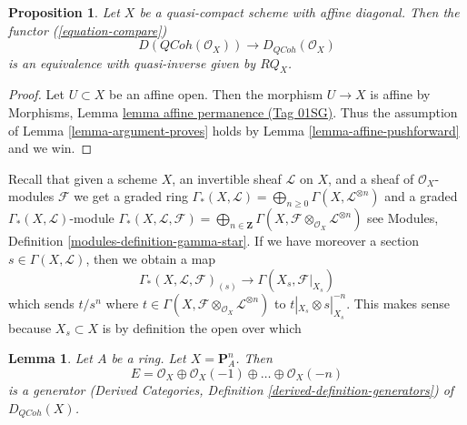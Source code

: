 \documentclass{amsart}
\theoremstyle{plain}
\newtheorem{proposition}[subsection]{Proposition}
\newtheorem{lemma}[subsection]{Lemma}
\theoremstyle{definition}
\theoremstyle{remark}
\numberwithin{equation}{subsection}
\def\QCoh{\mathit{QCoh}}
\begin{document}
\begin{proposition}
\label{proposition-quasi-compact-affine-diagonal}
Let $X$ be a quasi-compact scheme with affine diagonal.
Then the functor (\ref{equation-compare})
$$
D(\QCoh(\mathcal{O}_X))
\longrightarrow
D_\QCoh(\mathcal{O}_X)
$$
is an equivalence with quasi-inverse given by $RQ_X$.
\end{proposition}

\begin{proof}
Let $U \subset X$ be an affine open. Then the morphism
$U \to X$ is affine by
Morphisms, Lemma \href{https://stacks.math.columbia.edu/tag/01SG}{lemma affine permanence (Tag 01SG)}.
Thus the assumption of Lemma \ref{lemma-argument-proves}
holds by Lemma \ref{lemma-affine-pushforward} and we win.
\end{proof}


\noindent
Recall that given a scheme $X$, an invertible sheaf $\mathcal{L}$
on $X$, and a sheaf of $\mathcal{O}_X$-modules $\mathcal{F}$
we get a graded ring
$\Gamma_*(X, \mathcal{L}) =
\bigoplus\nolimits_{n \geq 0} \Gamma(X, \mathcal{L}^{\otimes n})$
and a graded $\Gamma_*(X, \mathcal{L})$-module
$\Gamma_*(X, \mathcal{L}, \mathcal{F}) =
\bigoplus\nolimits_{n \in \mathbf{Z}}
\Gamma(X, \mathcal{F} \otimes_{\mathcal{O}_X} \mathcal{L}^{\otimes n})$
see Modules, Definition \ref{modules-definition-gamma-star}.
If we have moreover a section $s \in \Gamma(X, \mathcal{L})$, then
we obtain a map
\begin{equation}
\label{properties-equation-module-invert-s}
\Gamma_*(X, \mathcal{L}, \mathcal{F})_{(s)}
\longrightarrow
\Gamma(X_s, \mathcal{F}|_{X_s})
\end{equation}
which sends $t/s^n$ where
$t \in \Gamma(X, \mathcal{F} \otimes_{\mathcal{O}_X} \mathcal{L}^{\otimes n})$
to $t|_{X_s} \otimes s|_{X_s}^{-n}$. This makes sense
because $X_s \subset X$ is by definition the open over which


\begin{lemma}
\label{lemma-generator-P1}
Let $A$ be a ring. Let $X = \mathbf{P}^n_A$. Then
$$
E =
\mathcal{O}_X \oplus \mathcal{O}_X(-1) \oplus \ldots \oplus \mathcal{O}_X(-n)
$$
is a generator
(Derived Categories, Definition \ref{derived-definition-generators})
of $D_\QCoh(X)$.
\end{lemma}
\end{document}
